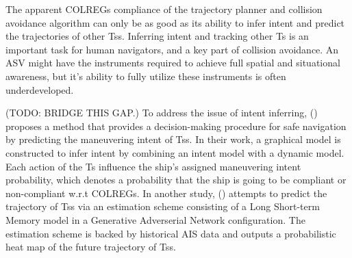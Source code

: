 The apparent \gls{COLREGs} compliance of the trajectory planner and collision avoidance algorithm can only be as 
good as its ability to infer intent and predict the trajectories of other \gls{Ts}s. 
Inferring intent and tracking other \gls{Ts} is an important task for human navigators, and a key part of collision avoidance.
An \gls{ASV} might have the instruments required to achieve full spatial and situational awareness, but it's ability to
fully utilize these instruments is often underdeveloped.

(TODO: BRIDGE THIS GAP.)\newline
To address the issue of intent inferring, (\cite{cho2018intent}) proposes a method that provides a decision-making procedure
for safe navigation by predicting the maneuvering intent of \gls{Ts}s. In their work, a graphical model is constructed to infer intent by
combining an intent model with a dynamic model. Each action of the \gls{Ts} influence the ship's assigned maneuvering intent probability,
which denotes a probability that the ship is going to be compliant or non-compliant w.r.t \gls{COLREGs}.
In another study, (\cite{scholler2021trajectory}) attempts to predict the trajectory of \gls{Ts}s via an estimation scheme consisting
of a Long Short-term Memory model in a Generative Adverserial Network configuration. The estimation scheme is backed by historical \gls{AIS} data
and outputs a probabilistic heat map of the future trajectory of \gls{Ts}s.

